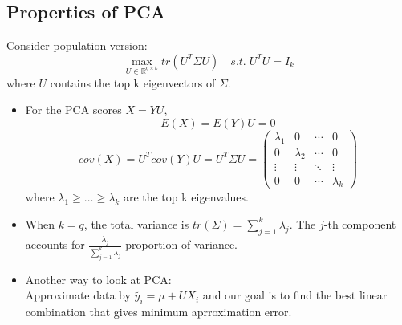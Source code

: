 \documentclass[12pt]{book}
\theoremstyle{definition}
\theoremstyle{remark}
\newcommand{\R}{\mathbb{R}}
\begin{document}
\begin{enumerate}
\subsection{Properties of PCA}
Consider population version: 
\[\underset{U\in\R^{q\times k}}{\max} tr(U^T\Sigma U) \quad s.t.\;U^TU = I_k\]
where $U$ contains the top k eigenvectors of $\Sigma$.
\begin{itemize}
    \item For the PCA scores $X = YU$, \[E(X) = E(Y)U = 0\]\[cov(X) = U^Tcov(Y)U = U^T\Sigma U = \begin{pmatrix}  
  \lambda_1 & 0 & \cdots & 0 \\  
  0 & \lambda_2 & \cdots & 0 \\  
  \vdots & \vdots & \ddots & \vdots \\  
  0 & 0 & \cdots & \lambda_k  
\end{pmatrix} \] where $\lambda_1 \ge \dots \ge \lambda_k$ are the top k eigenvalues.
    \item When $k = q$, the total variance is $tr(\Sigma) = \sum_{j=1}^k \lambda_j$. The $j$-th component accounts for $\frac{\lambda_j}{\sum_{j=1}^k \lambda_j}$ proportion of variance.
    \item Another way to look at PCA:\\
    Approximate data by $\tilde{y_i} = \mu+UX_i$ and our goal is to find the best linear combination that gives minimum aprroximation error.
\end{itemize}
    
\end{enumerate}
\end{document}
